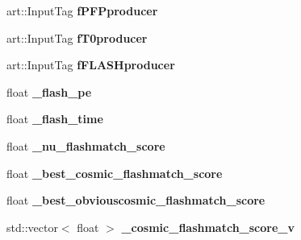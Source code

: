 \begin{DoxyCompactItemize}
\item 
art\+::\+Input\+Tag {\bfseries f\+P\+F\+Pproducer}\hypertarget{classanalysis_1_1FlashMatching_ab08a41fbfa79153063d300f2f00cf2ce}{}\label{classanalysis_1_1FlashMatching_ab08a41fbfa79153063d300f2f00cf2ce}

\item 
art\+::\+Input\+Tag {\bfseries f\+T0producer}\hypertarget{classanalysis_1_1FlashMatching_adc40aeaba0f5c6e5db982a2630a5c869}{}\label{classanalysis_1_1FlashMatching_adc40aeaba0f5c6e5db982a2630a5c869}

\item 
art\+::\+Input\+Tag {\bfseries f\+F\+L\+A\+S\+Hproducer}\hypertarget{classanalysis_1_1FlashMatching_a235f92e1625fa1ac9d039485b08f0062}{}\label{classanalysis_1_1FlashMatching_a235f92e1625fa1ac9d039485b08f0062}

\item 
float {\bfseries \+\_\+flash\+\_\+pe}\hypertarget{classanalysis_1_1FlashMatching_afec8c0a8f8814fabf44f9c101227536d}{}\label{classanalysis_1_1FlashMatching_afec8c0a8f8814fabf44f9c101227536d}

\item 
float {\bfseries \+\_\+flash\+\_\+time}\hypertarget{classanalysis_1_1FlashMatching_a7b659d97771be437d852b83aa3b8543f}{}\label{classanalysis_1_1FlashMatching_a7b659d97771be437d852b83aa3b8543f}

\item 
float {\bfseries \+\_\+nu\+\_\+flashmatch\+\_\+score}\hypertarget{classanalysis_1_1FlashMatching_ad5378659d44adbf60961370b7e09059f}{}\label{classanalysis_1_1FlashMatching_ad5378659d44adbf60961370b7e09059f}

\item 
float {\bfseries \+\_\+best\+\_\+cosmic\+\_\+flashmatch\+\_\+score}\hypertarget{classanalysis_1_1FlashMatching_a1272dc1455e89eea53d439c1789562c5}{}\label{classanalysis_1_1FlashMatching_a1272dc1455e89eea53d439c1789562c5}

\item 
float {\bfseries \+\_\+best\+\_\+obviouscosmic\+\_\+flashmatch\+\_\+score}\hypertarget{classanalysis_1_1FlashMatching_a37d29c4362498710cb68584518ee4ec6}{}\label{classanalysis_1_1FlashMatching_a37d29c4362498710cb68584518ee4ec6}

\item 
std\+::vector$<$ float $>$ {\bfseries \+\_\+cosmic\+\_\+flashmatch\+\_\+score\+\_\+v}\hypertarget{classanalysis_1_1FlashMatching_a4a23f572bbc5503c07fdd410d7742598}{}\label{classanalysis_1_1FlashMatching_a4a23f572bbc5503c07fdd410d7742598}

\end{DoxyCompactItemize}


